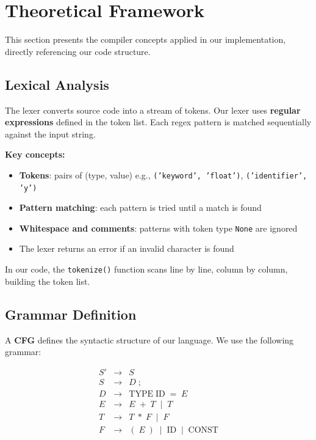 \documentclass[letterpaper,12pt,oneside]{article}
\begin{document}
	
\section{Theoretical Framework}
	
	This section presents the compiler concepts applied in our implementation, directly referencing our code structure.
	
	\subsection{Lexical Analysis}
	
	The lexer converts source code into a stream of tokens. Our lexer uses \textbf{regular expressions} defined in the token list. Each regex pattern is matched sequentially against the input string.
	
	\textbf{Key concepts:}
	\begin{itemize}
		\item \textbf{Tokens}: pairs of (type, value) e.g., \texttt{('keyword', 'float')}, \texttt{('identifier', 'y')}
		\item \textbf{Pattern matching}: each pattern is tried until a match is found
		\item \textbf{Whitespace and comments}: patterns with token type \texttt{None} are ignored
		\item The lexer returns an error if an invalid character is found
	\end{itemize}
	
	In our code, the \texttt{tokenize()} function scans line by line, column by column, building the token list.
	
	\subsection{Grammar Definition}
	
	A \textbf{CFG} defines the syntactic structure of our language. We use the following grammar:
	
	\[
	\begin{array}{lcl}
		S' & \rightarrow & S \\
		S & \rightarrow & D \; ; \\
		D & \rightarrow & \text{TYPE} \; \text{ID} \; = \; E \\
		E & \rightarrow & E \; + \; T \;\;|\;\; T \\
		T & \rightarrow & T \; * \; F \;\;|\;\; F \\
		F & \rightarrow & ( \; E \; ) \;\;|\;\; \text{ID} \;\;|\;\; \text{CONST}
	\end{array}
	\]
	
\end{document}
